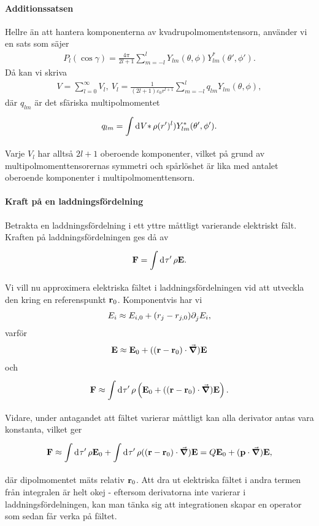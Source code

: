 \paragraph{Additionssatsen}
Hellre än att hantera komponenterna av kvadrupolmomentstensorn, använder vi en sats som säjer
\begin{align*}
	P_{l}(\cos{\gamma}) = \frac{4\pi}{2l + 1}\sum\limits_{m = -l}^{l}Y_{lm}(\theta, \phi)Y_{lm}^{*}(\theta', \phi').
\end{align*}
Då kan vi skriva
\begin{align*}
	V = \sum\limits_{l = 0}^{\infty}V_{l},\ V_{l} = \frac{1}{(2l + 1)\varepsilon_{0}r^{l + 1}}\sum\limits_{m = -l}^{l}q_{lm}Y_{lm}(\theta, \phi),
\end{align*}
där $q_{lm}$ är det sfäriska multipolmomentet
\begin{align*}
	q_{lm} = \int\limits_{}^{}\dd[]{V*}\rho (r')^{l})Y_{lm}^{*}(\theta', \phi').
\end{align*}
Varje $V_{l}$ har alltså $2l + 1$ oberoende komponenter, vilket på grund av multipolmomenttensorernas symmetri och spårlöshet är lika med antalet oberoende komponenter i multipolmomenttensorn.

\paragraph{Kraft på en laddningsfördelning}
Betrakta en laddningsfördelning i ett yttre måttligt varierande elektriskt fält. Kraften på laddningsfördelningen ges då av
\begin{align*}
	\vb{F} = \int\limits_{}^{}\dd[]{\tau'}\rho\vb{E}.
\end{align*}
Vi vill nu approximera elektriska fältet i laddningsfördelningen vid att utveckla den kring en referenspunkt $\vb{r}_{0}$. Komponentvis har vi
\begin{align*}
	E_{i} \approx E_{i, 0} + (r_{j} - r_{j, 0})\partial_{j}^{}E_{i},
\end{align*}
varför
\begin{align*}
	\vb{E} \approx \vb{E}_{0} + ((\vb{r} - \vb{r}_{0})\cdot\grad)\vb{E}
\end{align*}
och
\begin{align*}
	\vb{F} \approx \int\limits_{}^{}\dd[]{\tau'}\rho\left(\vb{E}_{0} + ((\vb{r} - \vb{r}_{0})\cdot\grad)\vb{E}\right).
\end{align*}
Vidare, under antagandet att fältet varierar måttligt kan alla derivator antas vara konstanta, vilket ger
\begin{align*}
	\vb{F} \approx \int\limits_{}^{}\dd[]{\tau'}\rho\vb{E}_{0} + \int\limits_{}^{}\dd[]{\tau'}\rho((\vb{r} - \vb{r}_{0})\cdot\grad)\vb{E} = Q\vb{E}_{0} + (\vb{p}\cdot\grad)\vb{E},
\end{align*}
där dipolmomentet mäts relativ $\vb{r}_{0}$. Att dra ut elektriska fältet i andra termen från integralen är helt okej - eftersom derivatorna inte varierar i laddningsfördelningen, kan man tänka sig att integrationen skapar en operator som sedan får verka på fältet.

